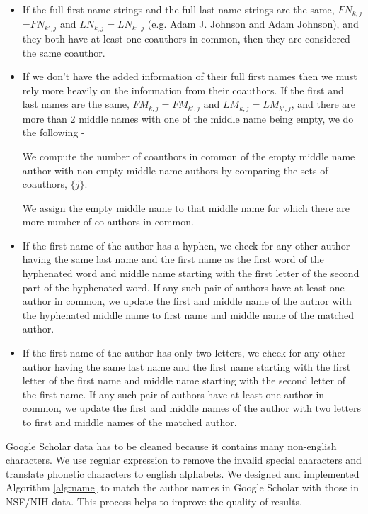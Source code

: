  \begin{itemize}
 \item If the full first name strings and the full last name strings are the same, $FN_{k,j}$=$FN_{k',j}$ and $LN_{k,j} = LN_{k',j}$ (e.g. Adam J. Johnson and Adam Johnson), and they both have at least one coauthors in common,  then they are considered the same coauthor. 
 \item If we don't have the added information of their full first names then we must rely more heavily on the information from their coauthors. If the first and last names are the same, $FM_{k,j}=FM_{k',j}$ and $LM_{k,j}=LM_{k',j}$, and there are more than 2 middle names with one of the middle name being empty, we do the following -
 
 We compute the number of coauthors in common of the empty middle name author with non-empty middle name authors by comparing the sets of coauthors, $\{j\}$.%
 
 We assign the empty middle name to that middle name for which there are more number of co-authors in common.
 
 \item If the first name of the author has a hyphen, we check for any other author having the same last name and the first name as the first word of the hyphenated word and middle name starting with the first letter of the second part of the hyphenated word. If any such pair of authors have at least one author in common, we update the first and middle name of the author with the hyphenated middle name to first name and middle name of the matched author.


\item If the first name of the author has only two letters, we check for any other author having the same last name and the first name starting with the first letter of the first name and middle name starting with the second letter of the first name. If any such pair of authors have at least one author in common, we update the first and middle names of the author with two letters to first and middle names of the matched author.
  
\end{itemize}
Google Scholar data has to be cleaned because it contains many non-english characters. We use regular expression to remove the invalid special characters and translate phonetic characters to english alphabets. We designed and implemented Algorithm \ref{alg:name} to match the author names in Google Scholar with those in NSF/NIH data. This process helps to improve the quality of results. 

